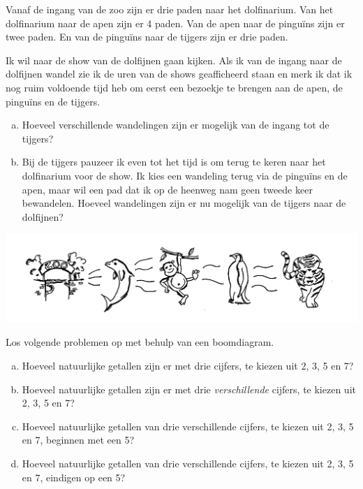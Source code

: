\documentclass[12pt,a4paper,twoside]{article}
\begin{document}
\begin{oefening}
Vanaf de ingang van de zoo zijn er drie paden naar het dolfinarium. Van het dolfinarium naar de apen zijn er 4 paden. Van de apen naar de pinguïns zijn er twee paden. En van de pinguïns naar de tijgers zijn er drie paden.

Ik wil naar de show van de dolfijnen gaan kijken. Als ik van de ingang naar de dolfijnen wandel zie ik de uren van de shows geafficheerd staan en merk ik dat ik nog ruim voldoende tijd heb om eerst een bezoekje te brengen aan de apen, de pinguïns en de tijgers.

\begin{enumerate}[(a)]
  \item Hoeveel verschillende wandelingen zijn er mogelijk van de ingang tot de tijgers?
  \item Bij de tijgers pauzeer ik even tot het tijd is om terug te keren naar het dolfinarium voor de show. Ik kies een wandeling terug via de pinguïns en de apen, maar wil een pad dat ik op de heenweg nam geen tweede keer bewandelen. Hoeveel wandelingen zijn er nu mogelijk van de tijgers naar de dolfijnen?
\end{enumerate}
\begin{center}
  \includegraphics[width=\textwidth]{zoodieren}
\end{center}
\end{oefening}

\begin{oefening}
Los volgende problemen op met behulp van een boomdiagram.
\begin{enumerate}[(a)]
  \item Hoeveel natuurlijke getallen zijn er met drie cijfers, te kiezen uit 2, 3, 5 en 7?
  \item Hoeveel natuurlijke getallen zijn er met drie {\em verschillende} cijfers, te kiezen uit 2, 3, 5 en 7?
  \item Hoeveel natuurlijke getallen van drie verschillende cijfers, te kiezen uit 2, 3, 5 en 7, beginnen met een 5?
  \item Hoeveel natuurlijke getallen van drie verschillende cijfers, te kiezen uit 2, 3, 5 en 7, eindigen op een 5?
\end{enumerate}
\end{oefening}
\end{document}
